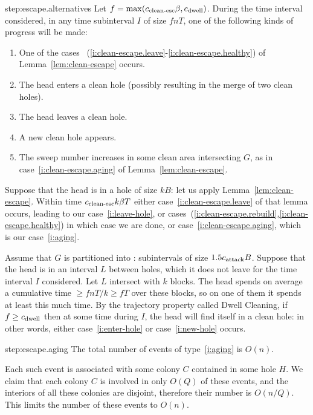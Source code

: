 \documentclass[12pt]{memoir}
\renewcommand{\ge}{\geq}
\def\B{B}
\newcommand{\f}{f}
\def\G{G}
\newcommand{\Q}{Q}
\newcommand{\Tu}{T}
\newcommand{\CDwell}{\cns{dwell}}
\newcommand{\cns}[1]{c_{\textrm{\upshape #1}}}
\newcommand{\CAtt}{\cns{attack}}
\newcommand{\CCleanEsc}{\cns{clean-esc}}
\begin{document}
\begin{Proof}
\begin{step+}{step:escape.alternatives}
Let \( \f=\max(\CCleanEsc\beta, \CDwell) \).
During the time interval considered, in any time subinterval \( I \) of size \( \f n\Tu \),
one of the following kinds of progress will be made:
\begin{enumerate}[label=\upshape{(p\arabic*)}, ref=p\arabic*]
\item\label{i:clean-escape} One of the cases ~(\ref{i:clean-escape.leave}-\ref{i:clean-escape.healthy}) 
of Lemma~\ref{lem:clean-escape} occurs.
\item\label{i:enter-hole} The head enters a clean hole (possibly resulting in the merge of two clean holes).
\item\label{i:leave-hole} The head leaves a clean hole.
\item\label{i:new-hole} A new clean hole appears.
\item\label{i:aging} The sweep number 
increases in some clean area intersecting \( G \), as 
in case~\eqref{i:clean-escape.aging} of Lemma~\ref{lem:clean-escape}.
\end{enumerate}
\end{step+}
\begin{pproof}
Suppose that the head is in a hole of size \( k\B \): let us apply 
Lemma~\ref{lem:clean-escape}.
Within time \( \CCleanEsc k\beta\Tu \) either case~\eqref{i:clean-escape.leave} of that lemma occurs,
leading to our case~\eqref{i:leave-hole},
or cases~(\ref{i:clean-escape.rebuild},\ref{i:clean-escape.healthy}) in which case we are done, or
case~\eqref{i:clean-escape.aging}, which is our case~\eqref{i:aging}.

Assume that \( \G \) is partitioned into : subintervals of size \( 1.5\CAtt\B \).
Suppose that the head is in an interval \( L \) between holes, which it does not leave for 
the time interval \( I \) considered.
Let \( L \) intersect with \( k \) blocks.
The head spends on average a cumulative time \( \ge\f n\Tu/k\ge\f\Tu \) over these blocks, so
on one of them it spends at least this much time.
By the trajectory property called Dwell Cleaning, if \( \f\ge\CDwell \) then at some
time during \( I \), the head will find itself in a clean hole: in other words,
either case~\eqref{i:enter-hole} or case~\eqref{i:new-hole} occurs.
\end{pproof} %

\begin{step+}{step:escape.aging}
The total number of events of type~\eqref{i:aging} is \( O(n) \).
\end{step+}
\begin{pproof}
Each such event is associated with some colony \( C \) contained in some hole \( H \).
We claim that each colony \( C \) is involved in only \( O(\Q) \) of these events,
and the interiors of all these colonies are disjoint, therefore their number is \( O(n/\Q) \).
This limits the number of these events to \( O(n) \).


\end{pproof}
\end{Proof}
\end{document}
